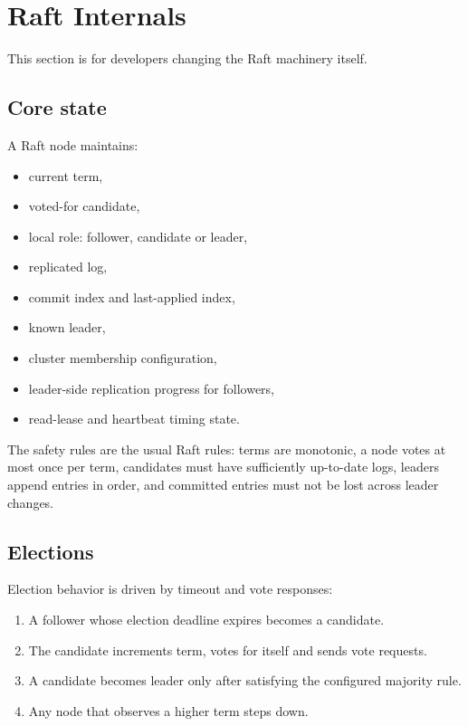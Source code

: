 \section{Raft Internals}
\label{sec:RaftInternals}

This section is for developers changing the Raft machinery itself.

\subsection{Core state}

A Raft node maintains:

\begin{itemize}
\item current term,
\item voted-for candidate,
\item local role: follower, candidate or leader,
\item replicated log,
\item commit index and last-applied index,
\item known leader,
\item cluster membership configuration,
\item leader-side replication progress for followers,
\item read-lease and heartbeat timing state.
\end{itemize}

The safety rules are the usual Raft rules: terms are monotonic, a node votes at
most once per term, candidates must have sufficiently up-to-date logs, leaders
append entries in order, and committed entries must not be lost across leader
changes.

\subsection{Elections}

Election behavior is driven by timeout and vote responses:

\begin{enumerate}
\item A follower whose election deadline expires becomes a candidate.
\item The candidate increments term, votes for itself and sends vote requests.
\item A candidate becomes leader only after satisfying the configured majority rule.
\item Any node that observes a higher term steps down.
\end{enumerate}

